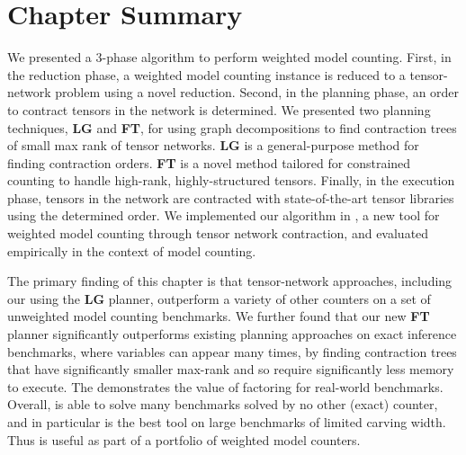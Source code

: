 \section{Chapter Summary} \label{sec:tensors:conclusion}
We presented a 3-phase algorithm to perform weighted model counting. First, in the reduction phase, a weighted model counting instance is reduced to a tensor-network problem using a novel reduction. Second, in the planning phase, an order to contract tensors in the network is determined. We presented two planning techniques, \textbf{LG} and \textbf{FT}, for using graph decompositions to find contraction trees of small max rank of tensor networks. \textbf{LG} is a general-purpose method for finding contraction orders. \textbf{FT} is a novel method tailored for constrained counting to handle high-rank, highly-structured tensors. Finally, in the execution phase, tensors in the network are contracted with state-of-the-art tensor libraries using the determined order.
We implemented our algorithm in , a new tool for weighted model counting through tensor network contraction, and evaluated  empirically in the context of model counting.

The primary finding of this chapter is that tensor-network approaches, including our  using the \textbf{LG} planner, outperform a variety of other counters on a set of unweighted model counting benchmarks.
We further found that our new \textbf{FT} planner significantly outperforms existing planning approaches on exact inference benchmarks, where variables can appear many times, by finding contraction trees that have significantly smaller max-rank and so require significantly less memory to execute.
The demonstrates the value of factoring for real-world benchmarks.
Overall,  is able to solve many benchmarks solved by no other (exact) counter, and in particular  is the best tool on large benchmarks of limited carving width.
Thus  is useful as part of a portfolio of weighted model counters.


